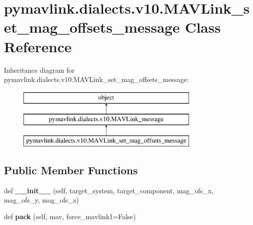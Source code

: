 \hypertarget{classpymavlink_1_1dialects_1_1v10_1_1MAVLink__set__mag__offsets__message}{}\section{pymavlink.\+dialects.\+v10.\+M\+A\+V\+Link\+\_\+set\+\_\+mag\+\_\+offsets\+\_\+message Class Reference}
\label{classpymavlink_1_1dialects_1_1v10_1_1MAVLink__set__mag__offsets__message}
Inheritance diagram for pymavlink.\+dialects.\+v10.\+M\+A\+V\+Link\+\_\+set\+\_\+mag\+\_\+offsets\+\_\+message\+:\begin{figure}[H]
\begin{center}
\leavevmode
\includegraphics[height=3.000000cm]{classpymavlink_1_1dialects_1_1v10_1_1MAVLink__set__mag__offsets__message}
\end{center}
\end{figure}
\subsection*{Public Member Functions}
\begin{DoxyCompactItemize}
\item 
\mbox{\label{classpymavlink_1_1dialects_1_1v10_1_1MAVLink__set__mag__offsets__message_a9adc02d366938f1cab9ad9273172359e}} 
def {\bfseries \+\_\+\+\_\+init\+\_\+\+\_\+} (self, target\+\_\+system, target\+\_\+component, mag\+\_\+ofs\+\_\+x, mag\+\_\+ofs\+\_\+y, mag\+\_\+ofs\+\_\+z)
\item 
\mbox{\label{classpymavlink_1_1dialects_1_1v10_1_1MAVLink__set__mag__offsets__message_a8eb011deeb83e6392408d9e9f2821197}} 
def {\bfseries pack} (self, mav, force\+\_\+mavlink1=False)
\end{DoxyCompactItemize}
